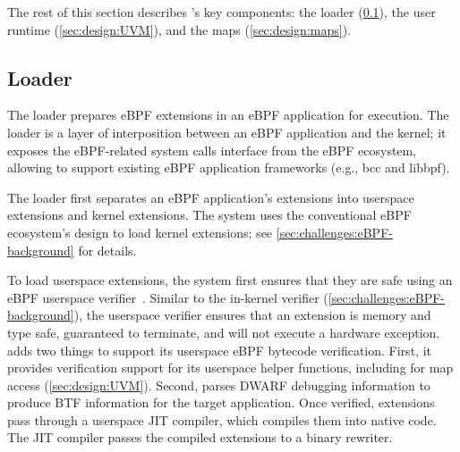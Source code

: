 The rest of this section describes \sys{}'s key components: the \sys{} loader (\cref{sec:design:loader}), the \sys{} user runtime (\cref{sec:design:UVM}), and the \sys{} maps (\cref{sec:design:maps}). 

\subsection{\sys Loader}\label{sec:design:loader}
The \sys{} loader prepares eBPF extensions in an eBPF application for execution.  The loader is a layer of interposition between an eBPF application and the kernel; it exposes the  eBPF-related system calls interface from the eBPF ecosystem, allowing \sys{} to support existing eBPF application frameworks (e.g., bcc and libbpf). 

The \sys{} loader first separates an eBPF application's extensions into userspace extensions and kernel extensions.  The system uses the conventional eBPF ecosystem's design to load kernel extensions; see \cref{sec:challenges:eBPF-background} for details. 

To load userspace extensions, the system first ensures that they are safe using an eBPF userspace verifier~\cite{Gershuni19}.  Similar to the in-kernel verifier (\cref{sec:challenges:eBPF-background}), the userspace verifier ensures that an extension is memory and type safe, guaranteed to terminate, and will not execute a hardware exception.  \sys{} adds two things to support its userspace eBPF bytecode verification.  First, it provides verification support for its userspace helper functions, including for map access (\cref{sec:design:UVM}).  Second, \sys{} parses DWARF debugging information to produce BTF information for the target application.  Once verified, extensions pass through a userspace JIT compiler, which compiles them into native code. The JIT compiler passes the compiled extensions to a binary rewriter. 


